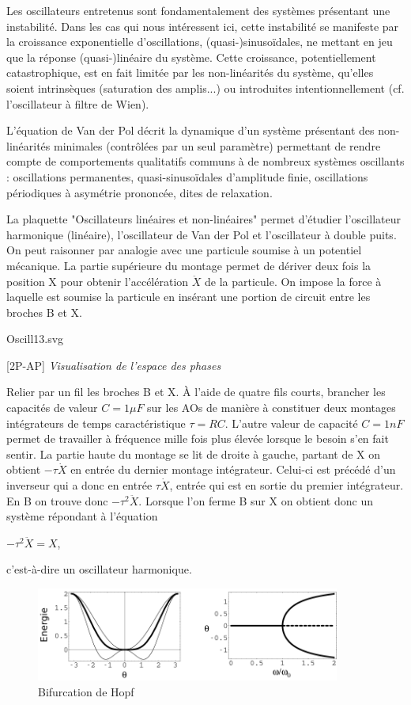 \documentclass{article}%
\begin{document}
Les oscillateurs entretenus sont fondamentalement des systèmes présentant une instabilité. Dans les cas qui nous intéressent ici, cette instabilité se manifeste par la croissance exponentielle d'oscillations, (quasi-)sinusoïdales, ne mettant en jeu que la réponse (quasi-)linéaire du système. Cette croissance, potentiellement catastrophique, est en fait limitée par les non-linéarités du système, qu'elles soient intrinsèques (saturation des amplis...) ou introduites intentionnellement (cf. l'oscillateur à filtre de Wien).

L'équation de Van der Pol décrit la dynamique d'un système présentant des non-linéarités minimales (contrôlées par un seul paramètre) permettant de rendre compte de comportements qualitatifs communs à de nombreux systèmes oscillants : oscillations permanentes, quasi-sinusoïdales d'amplitude finie, oscillations périodiques à asymétrie prononcée, dites de relaxation.

La plaquette "Oscillateurs linéaires et non-linéaires" permet d'étudier l'oscillateur harmonique (linéaire), l'oscillateur de Van der Pol et l'oscillateur à double puits. On peut raisonner par analogie avec une particule soumise à un potentiel mécanique. La partie supérieure du montage permet de dériver deux fois la position X pour obtenir l'accélération $\ddot X$ de la particule. On impose la force à laquelle est soumise la particule en insérant une portion de circuit entre les broches B et X.

Oscill13.svg

[2P-AP] \textit{Visualisation de l'espace des phases}

Relier par un fil les broches B et X. À l'aide de quatre fils courts, brancher les capacités de valeur $C=1 \mu F$ sur les AOs de manière à constituer deux montages intégrateurs de temps caractéristique $\tau=RC$. L'autre valeur de capacité $C=1 nF$ permet de travailler à fréquence mille fois plus élevée lorsque le besoin s'en fait sentir. La partie haute du montage se lit de droite à gauche, partant de X on obtient $- \tau \dot X$ en entrée du dernier montage intégrateur. Celui-ci est précédé d'un inverseur qui a donc en entrée $\tau \dot X$, entrée qui est en sortie du premier intégrateur. En B on trouve donc $- \tau^2 \ddot X$. Lorsque l'on ferme B sur X on obtient donc un système répondant à l'équation

   $ -\tau^2 \ddot X=X$,

c'est-à-dire un oscillateur harmonique.
\begin{figure}
	\centerline{\includegraphics[width=10cm]{images-exp/PhysNL_BifFourche2.png}}
	\caption{Bifurcation de Hopf}
\end{figure}
\end{document}
